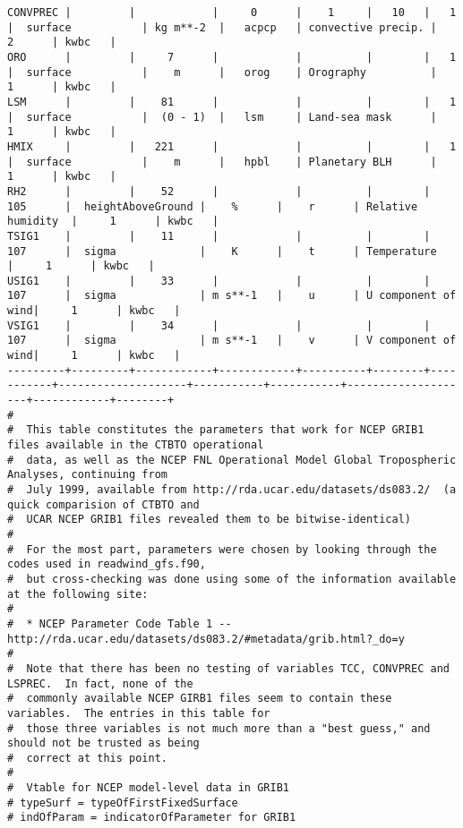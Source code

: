\documentclass{egu}                  %
\begin{document}
\begin{landscape}
\begin{scriptsize}
\begin{verbatim}
CONVPREC |         |            |     0      |    1     |   10   |   1       |  surface           | kg m**-2  |   acpcp   | convective precip. |     2      | kwbc   |
ORO      |         |     7      |            |          |        |   1       |  surface           |    m      |   orog    | Orography          |     1      | kwbc   |
LSM      |         |    81      |            |          |        |   1       |  surface           |  (0 - 1)  |   lsm     | Land-sea mask      |     1      | kwbc   |
HMIX     |         |   221      |            |          |        |   1       |  surface           |    m      |   hpbl    | Planetary BLH      |     1      | kwbc   |
RH2      |         |    52      |            |          |        |  105      |  heightAboveGround |    %      |    r      | Relative humidity  |     1      | kwbc   |
TSIG1    |         |    11      |            |          |        |  107      |  sigma             |    K      |    t      | Temperature        |     1      | kwbc   |
USIG1    |         |    33      |            |          |        |  107      |  sigma             | m s**-1   |    u      | U component of wind|     1      | kwbc   |
VSIG1    |         |    34      |            |          |        |  107      |  sigma             | m s**-1   |    v      | V component of wind|     1      | kwbc   |
---------+---------+------------+------------+----------+--------+-----------+--------------------+-----------+-----------+--------------------+------------+--------+
#
#  This table constitutes the parameters that work for NCEP GRIB1 files available in the CTBTO operational
#  data, as well as the NCEP FNL Operational Model Global Tropospheric Analyses, continuing from
#  July 1999, available from http://rda.ucar.edu/datasets/ds083.2/  (a quick comparision of CTBTO and
#  UCAR NCEP GRIB1 files revealed them to be bitwise-identical)
#
#  For the most part, parameters were chosen by looking through the codes used in readwind_gfs.f90,
#  but cross-checking was done using some of the information available at the following site:
#
#  * NCEP Parameter Code Table 1 -- http://rda.ucar.edu/datasets/ds083.2/#metadata/grib.html?_do=y
#
#  Note that there has been no testing of variables TCC, CONVPREC and LSPREC.  In fact, none of the 
#  commonly available NCEP GIRB1 files seem to contain these variables.  The entries in this table for
#  those three variables is not much more than a "best guess," and should not be trusted as being
#  correct at this point.
#
#  Vtable for NCEP model-level data in GRIB1
# typeSurf = typeOfFirstFixedSurface
# indOfParam = indicatorOfParameter for GRIB1

\end{verbatim}
\end{scriptsize}
\end{landscape}
\end{document}
